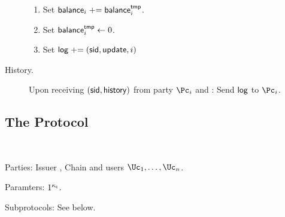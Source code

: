 \begin{functionality}
\begin{description}
		\begin{enumerate}
			\item Set $\mathsf{balance}_i  \mathrel{+}= \mathsf{balance}^{\mathsf{tmp}}_i$.
			
			\item Set $\mathsf{balance}^{\mathsf{tmp}}_i  \leftarrow 0$.
			
				\item Set $\mathsf{log} \mathrel{+}= (\mathsf{sid},\mathsf{update},i)$
			
			
		\end{enumerate}

		
		
		\item[History.]     Upon receiving $(\mathsf{sid},\mathsf{history})$ from  party $\Pc_i$ and \Cc:  Send $\mathsf{log}$ to  $\Pc_i$.	 
		
	\end{description}

\end{functionality}

\subsection{The Protocol}\label{sec:MainProtocol:Protocol}

\newcommand{\KeyGen}{\MathAlgX{KeyGen}}

\begin{protocol}~\label{prot:ConfidentialTransactions}

\item[Parties:] Issuer \Ic, Chain \Cc and users  $\Uc_1, \ldots,\Uc_n$.

\item[Paramters:]	$1^{\kappa_{\mathsf c}}$.

\item[Subprotocols:]  See below.
\end{protocol}



